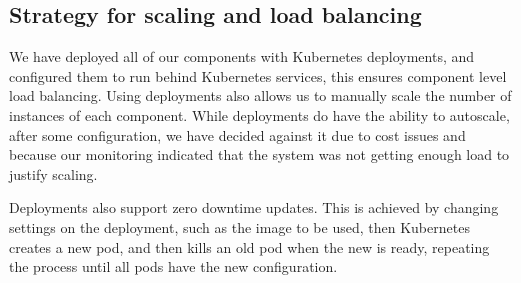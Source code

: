 \subsection{Strategy for scaling and load balancing}
We have deployed all of our components with Kubernetes deployments\cite{docs:kubernetes-deployment}, and configured them to run behind Kubernetes services\cite{docs:kubernetes-service}, this ensures component level load balancing.
Using deployments also allows us to manually scale the number of instances of each component. While deployments do have the ability to autoscale, after some configuration, we have decided against it due to cost issues and because our monitoring indicated that the system was not getting enough load to justify scaling.

Deployments also support zero downtime updates. This is achieved by changing settings on the deployment, such as the image to be used, then Kubernetes creates a new pod, and then kills an old pod when the new is ready, repeating the process until all pods have the new configuration.
